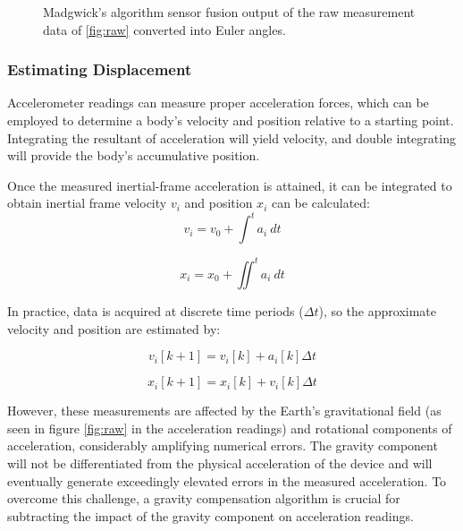 \begin{figure}
    \centering
    \resizebox{0.8\linewidth}{!}{}
    \caption{Madgwick's algorithm sensor fusion output of the raw measurement data of  \ref{fig:raw} converted into Euler angles.}
    \label{fig:fusion_output_euler}
\end{figure}


\newpage

\subsubsection{Estimating Displacement}

Accelerometer readings can measure proper acceleration forces, which can be employed to determine a body's velocity and position relative to a starting point. Integrating the resultant of acceleration will yield velocity, and double integrating will provide the body's accumulative position.

Once the measured inertial-frame acceleration is attained, it can be integrated to obtain inertial frame velocity $v_i$  and position $x_i$ can be calculated:
\begin{equation}
    v_i = v_0 +  \int^t a_i~dt
\end{equation}

\begin{equation}
    x_i = x_0 + \iint^t a_i~dt
\end{equation}

In practice, data is acquired at discrete time periods ($\Delta t$), so the approximate velocity and position are estimated by:

\begin{equation}
    v_i[k+1]= v_i[k]+a_i[k]\Delta t
\end{equation}

\begin{equation}
    x_i[k+1]= x_i[k]+v_i[k]\Delta t
\end{equation}

However, these measurements are affected by the Earth's gravitational field (as seen in figure \ref{fig:raw} in the acceleration readings) and rotational components of acceleration, considerably amplifying numerical errors. The gravity component will not be differentiated from the physical acceleration of the device and will eventually generate exceedingly elevated errors in the measured acceleration. To overcome this challenge, a gravity compensation algorithm is crucial for subtracting the impact of the gravity component on acceleration readings.

